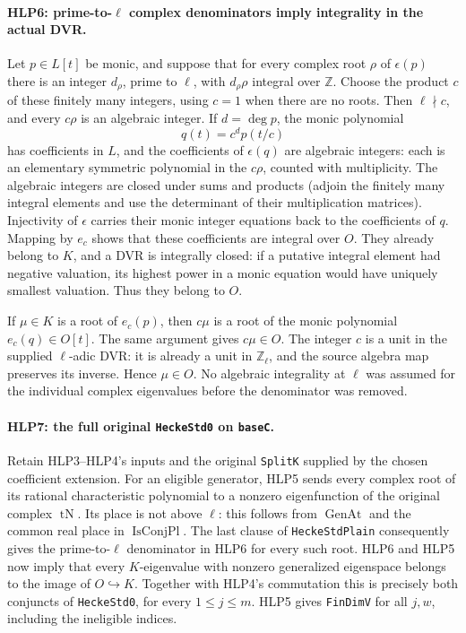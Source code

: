 \paragraph{HLP6: prime-to-\(\ell\) complex denominators imply integrality in the actual DVR.}
\label{claim:HLP6}
Let \(p\in L[t]\) be monic, and suppose that for every complex root
\(\rho\) of \(\epsilon(p)\) there is an integer \(d_\rho\), prime to
\(\ell\), with \(d_\rho\rho\) integral over \(\mathbb Z\). Choose the
product \(c\) of these finitely many integers, using \(c=1\) when
there are no roots. Then \(\ell\nmid c\), and every \(c\rho\) is an
algebraic integer. If \(d=\deg p\), the monic polynomial
\[
             q(t)=c^d p(t/c)                         \tag{HLP.5}
\]
has coefficients in \(L\), and the coefficients of \(\epsilon(q)\)
are algebraic integers: each is an elementary symmetric polynomial
in the \(c\rho\), counted with multiplicity. The algebraic integers
are closed under sums and products (adjoin the finitely many
integral elements and use the determinant of their multiplication
matrices). Injectivity of \(\epsilon\) carries their monic integer
equations back to the coefficients of \(q\). Mapping by \(e_c\)
shows that these coefficients are integral over \(O\). They already
belong to \(K\), and a DVR is integrally closed: if a putative
integral element had negative valuation, its highest power in a
monic equation would have uniquely smallest valuation. Thus they
belong to \(O\).

If \(\mu\in K\) is a root of \(e_c(p)\), then \(c\mu\) is a root
of the monic polynomial \(e_c(q)\in O[t]\). The same argument gives
\(c\mu\in O\). The integer \(c\) is a unit in the supplied
\(\ell\)-adic DVR: it is already a unit in \(\mathbb Z_\ell\), and
the source algebra map preserves its inverse. Hence \(\mu\in O\).
No algebraic integrality at \(\ell\) was assumed for the individual
complex eigenvalues before the denominator was removed.

\paragraph{HLP7: the full original \texttt{HeckeStd0} on \texttt{baseC}.}
\label{claim:HLP7}
Retain HLP3--HLP4's inputs and the original \texttt{SplitK} supplied
by the chosen coefficient extension. For an eligible generator,
HLP5 sends every complex root of its rational characteristic
polynomial to a nonzero eigenfunction of the original complex
\(\operatorname{tN}\). Its place is not above \(\ell\): this follows
from \(\operatorname{GenAt}\) and the common real place in
\(\operatorname{IsConjPl}\). The last clause of
\texttt{HeckeStdPlain} consequently gives the prime-to-\(\ell\)
denominator in HLP6 for every such root. HLP6 and HLP5 now imply
that every \(K\)-eigenvalue with nonzero generalized eigenspace
belongs to the image of \(O\hookrightarrow K\). Together with
HLP4's commutation this is precisely both conjuncts of
\texttt{HeckeStd0}, for every \(1\le j\le m\). HLP5 gives
\texttt{FinDimV} for all \(j,w\), including the ineligible indices.


